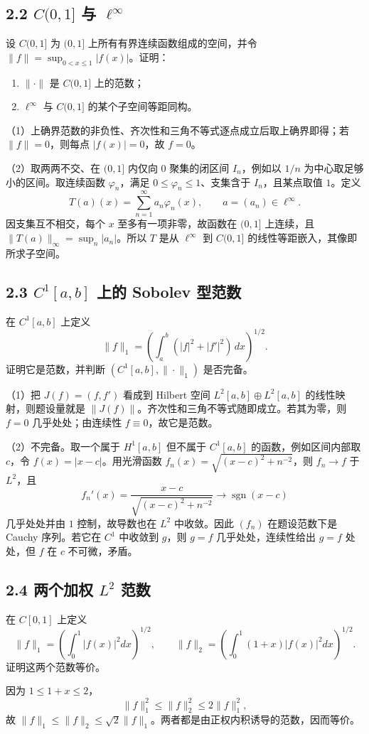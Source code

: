 \subsection*{2.2 $C(0,1]$ 与 $\ell^\infty$}
\begin{problem}
设 $C(0,1]$ 为 $(0,1]$ 上所有有界连续函数组成的空间，并令
$\|f\|=\sup_{0<x\le1}|f(x)|$。证明：
\begin{enumerate}[label=(\arabic*)]
\item $\|\cdot\|$ 是 $C(0,1]$ 上的范数；
\item $\ell^\infty$ 与 $C(0,1]$ 的某个子空间等距同构。
\end{enumerate}
\end{problem}
（1）上确界范数的非负性、齐次性和三角不等式逐点成立后取上确界即得；若 $\|f\|=0$，则每点 $|f(x)|=0$，故 $f=0$。

（2）取两两不交、在 $(0,1]$ 内仅向 $0$ 聚集的闭区间 $I_n$，例如以 $1/n$ 为中心取足够小的区间。取连续函数 $\varphi_n$，满足 $0\le\varphi_n\le1$、支集含于 $I_n$，且某点取值 $1$。定义
\[
T(a)(x)=\sum_{n=1}^\infty a_n\varphi_n(x),\qquad a=(a_n)\in\ell^\infty.
\]
因支集互不相交，每个 $x$ 至多有一项非零，故函数在 $(0,1]$ 上连续，且
$\|T(a)\|_\infty=\sup_n|a_n|$。所以 $T$ 是从 $\ell^\infty$ 到 $C(0,1]$ 的线性等距嵌入，其像即所求子空间。

\subsection*{2.3 $C^1[a,b]$ 上的 Sobolev 型范数}
\begin{problem}
在 $C^1[a,b]$ 上定义
\[
\|f\|_1=\left(\int_a^b(|f|^2+|f'|^2)\,dx\right)^{1/2}.
\]
证明它是范数，并判断 $(C^1[a,b],\|\cdot\|_1)$ 是否完备。
\end{problem}
（1）把 $J(f)=(f,f')$ 看成到 Hilbert 空间 $L^2[a,b]\oplus L^2[a,b]$ 的线性映射，则题设量就是 $\|J(f)\|$。齐次性和三角不等式随即成立。若其为零，则 $f=0$ 几乎处处；由连续性 $f\equiv0$，故它是范数。

（2）不完备。取一个属于 $H^1[a,b]$ 但不属于 $C^1[a,b]$ 的函数，例如区间内部取 $c$，令 $f(x)=|x-c|$。用光滑函数 $f_n(x)=\sqrt{(x-c)^2+n^{-2}}$，则 $f_n\to f$ 于 $L^2$，且
\[
f_n'(x)=\frac{x-c}{\sqrt{(x-c)^2+n^{-2}}}\to \operatorname{sgn}(x-c)
\]
几乎处处并由 $1$ 控制，故导数也在 $L^2$ 中收敛。因此 $(f_n)$ 在题设范数下是 Cauchy 序列。若它在 $C^1$ 中收敛到 $g$，则 $g=f$ 几乎处处，连续性给出 $g=f$ 处处，但 $f$ 在 $c$ 不可微，矛盾。

\subsection*{2.4 两个加权 $L^2$ 范数}
\begin{problem}
在 $C[0,1]$ 上定义
\[
\|f\|_1=\left(\int_0^1|f(x)|^2dx\right)^{1/2},\qquad
\|f\|_2=\left(\int_0^1(1+x)|f(x)|^2dx\right)^{1/2}.
\]
证明这两个范数等价。
\end{problem}
因为 $1\le1+x\le2$，
\[
\|f\|_1^2\le\|f\|_2^2\le2\|f\|_1^2,
\]
故 $\|f\|_1\le\|f\|_2\le\sqrt2\|f\|_1$。两者都是由正权内积诱导的范数，因而等价。

